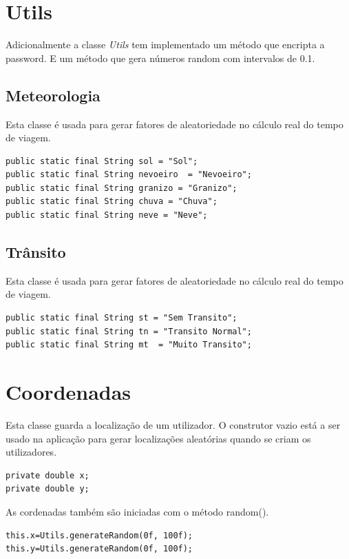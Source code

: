\section{Utils}
Adicionalmente a classe \textit{Utils} tem implementado um método que encripta a password. E um método que gera números random com intervalos de 0.1. 

\subsection{Meteorologia}

Esta classe é usada para gerar fatores de aleatoriedade no cálculo real do tempo de viagem.

\begin{verbatim}
public static final String sol = "Sol"; 
public static final String nevoeiro  = "Nevoeiro"; 
public static final String granizo = "Granizo";
public static final String chuva = "Chuva";
public static final String neve = "Neve"; 
\end{verbatim}

\subsection{Trânsito}

Esta classe é usada para gerar fatores de aleatoriedade no cálculo real do tempo de viagem.

\begin{verbatim}
public static final String st = "Sem Transito"; 
public static final String tn = "Transito Normal"; 
public static final String mt  = "Muito Transito"; 
\end{verbatim}

\section{Coordenadas}

Esta classe guarda a localização de um utilizador. O construtor vazio está a ser usado na aplicação para gerar localizações aleatórias quando se criam os utilizadores. 

\begin{verbatim}
private double x;
private double y;
\end{verbatim}

As cordenadas também são iniciadas com o método random(). 
\begin{verbatim}
this.x=Utils.generateRandom(0f, 100f);
this.y=Utils.generateRandom(0f, 100f);
\end{verbatim}


